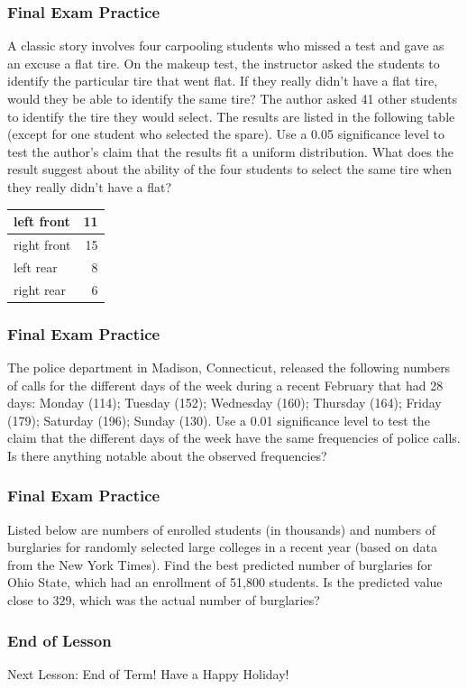 \documentclass[xcolor=dvipsnames]{beamer}
\begin{document}
\begin{frame}
  \frametitle{Final Exam Practice}
  {\ubung} A classic story involves four carpooling students who
  missed a test and gave as an excuse a flat tire. On the makeup test,
  the instructor asked the students to identify the particular tire
  that went flat. If they really didn't have a flat tire, would they
  be able to identify the same tire? The author asked 41 other
  students to identify the tire they would select. The results are
  listed in the following table (except for one student who selected
  the spare). Use a 0.05 significance level to test the author's claim
  that the results fit a uniform distribution. What does the result
  suggest about the ability of the four students to select the same
  tire when they really didn't have a flat?

  \begin{tabular}{|l|r|}\hline
        left front  & 11 \\ \hline
        right front & 15 \\ \hline
        left rear   & 8  \\ \hline
        right rear  & 6  \\ \hline
  \end{tabular}
\end{frame}

\begin{frame}
  \frametitle{Final Exam Practice}
  {\ubung} The police department in Madison, Connecticut, released the
  following numbers of calls for the different days of the week during
  a recent February that had 28 days: Monday (114); Tuesday (152);
  Wednesday (160); Thursday (164); Friday (179); Saturday (196);
  Sunday (130). Use a 0.01 significance level to test the claim that
  the different days of the week have the same frequencies of police
  calls. Is there anything notable about the observed frequencies?
\end{frame}

\begin{frame}
  \frametitle{Final Exam Practice}
  {\ubung} Listed below are numbers of enrolled students (in
  thousands) and numbers of burglaries for randomly selected large
  colleges in a recent year (based on data from the New York Times).
  Find the best predicted number of burglaries for Ohio State, which
  had an enrollment of 51,800 students. Is the predicted value close
  to 329, which was the actual number of burglaries?
\end{frame}

\begin{frame}
  \frametitle{End of Lesson}
Next Lesson: End of Term! Have a Happy Holiday!
\end{frame}
\end{document}
